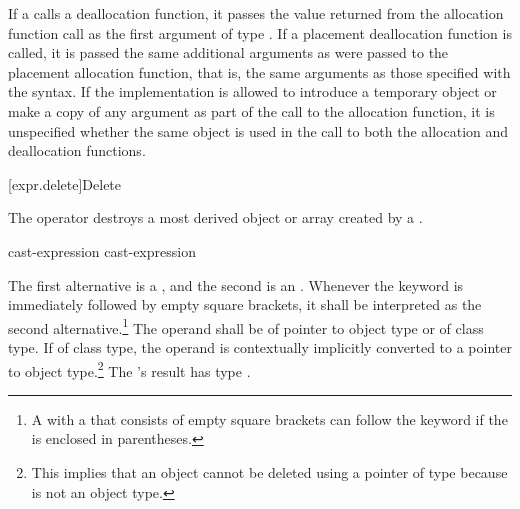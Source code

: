 \pnum
If a  calls a deallocation function, it passes
the value returned from the allocation function call as the first
argument of type . If a placement deallocation function is
called, it is passed the same additional arguments as were passed to the
placement allocation function, that is, the same arguments as those
specified with the  syntax.
If the implementation is allowed
to introduce a temporary object or make a copy of any argument
as part of the call to the allocation function,
it is unspecified whether the same object is used in the call
to both the allocation and deallocation functions.

[expr.delete]{Delete}

\pnum
{}%
%
The  operator destroys a most derived
object or array created by a
.

\begin{bnf}
\br
    \opt{\terminal{::}}  cast-expression\br
    \opt{\terminal{::}}  \terminal{[} \terminal{]} cast-expression
\end{bnf}

The first alternative is a
, and the
second is an .
Whenever the  keyword is immediately followed by empty square
brackets, it shall be interpreted as the second alternative.\footnote{A
 with a 
that consists of empty square brackets can follow the  keyword
if the  is enclosed in parentheses.}
The operand shall be of pointer to object type or of class type. If of
class type, the operand is contextually implicitly converted
to a pointer to object
type.\footnote{This implies that an object
cannot be deleted using a pointer of type
 because  is not an object type.}
The 's result has type
.

